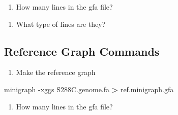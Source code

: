 \documentclass[
]{book}
\newenvironment{Shaded}{\begin{snugshade}}{\end{snugshade}}
\newcommand{\AttributeTok}[1]{\textcolor[rgb]{0.77,0.63,0.00}{#1}}
\newcommand{\ExtensionTok}[1]{#1}
\newcommand{\NormalTok}[1]{#1}
\newcommand{\OperatorTok}[1]{\textcolor[rgb]{0.81,0.36,0.00}{\textbf{#1}}}
\providecommand{\tightlist}{%
  \setlength{\itemsep}{0pt}\setlength{\parskip}{0pt}}
\begin{document}
\begin{Shaded}
\begin{Highlighting}[]

\end{Highlighting}
\end{Shaded}

\begin{enumerate}
\def\labelenumi{\arabic{enumi}.}
\setcounter{enumi}{1}
\tightlist
\item
  How many lines in the gfa file?
\end{enumerate}

\begin{Shaded}
\begin{Highlighting}[]

\end{Highlighting}
\end{Shaded}

\begin{enumerate}
\def\labelenumi{\arabic{enumi}.}
\setcounter{enumi}{2}
\tightlist
\item
  What type of lines are they?
\end{enumerate}

\begin{Shaded}
\begin{Highlighting}[]

\end{Highlighting}
\end{Shaded}

\hypertarget{reference-graph-commands}{%
\subsection*{Reference Graph Commands}\label{reference-graph-commands}}

\begin{enumerate}
\def\labelenumi{\arabic{enumi}.}
\tightlist
\item
  Make the reference graph
\end{enumerate}

\begin{Shaded}
\begin{Highlighting}[]
\ExtensionTok{minigraph} \AttributeTok{{-}xggs}\NormalTok{ S288C.genome.fa }\OperatorTok{\textgreater{}}\NormalTok{ ref.minigraph.gfa}
\end{Highlighting}
\end{Shaded}

\begin{enumerate}
\def\labelenumi{\arabic{enumi}.}
\setcounter{enumi}{1}
\tightlist
\item
  How many lines in the gfa file?
\end{enumerate}
\end{document}
